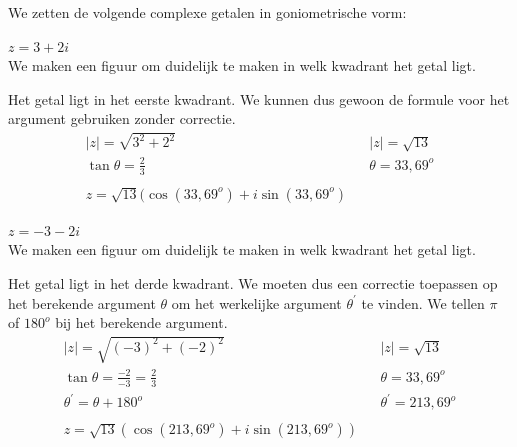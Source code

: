 	We zetten de volgende complexe getalen in goniometrische vorm: \\
\begin{voorbeeld}


	$z=3+2i$ \\  We maken een figuur om duidelijk te maken in welk kwadrant het getal ligt. \\

\begin{figure}[H]
	\centering 
	 
\end{figure}

	



	

	Het getal ligt in het eerste kwadrant. We kunnen dus gewoon de formule voor het argument gebruiken zonder correctie.\\
	\[ \begin{array}{lll}
	|z|=\sqrt{3^2 +2^2} & & |z|=\sqrt{13} \\
	\tan \theta = \frac{2}{3} & & \theta = 33,69^{o}\\
	         & &      \\
	z=\sqrt{13} (\cos (33,69^{o}) + i \sin (33,69^{o})  &  &
	\end{array} \]
\end{voorbeeld}
	
\begin{voorbeeld}
	$z=-3-2i$ \\ We maken een figuur om duidelijk te maken in welk kwadrant het getal ligt. \\
	


\begin{figure}[H]
	\centering 
	 
\end{figure}
	
	Het getal ligt in het derde kwadrant. We moeten dus een correctie toepassen op het berekende argument $\theta$ om het werkelijke argument $\theta^{'}$ te vinden. We tellen  $\pi$ of $180^{o}$ bij het berekende argument. \\
	\[ \begin{array}{lll}
	|z|=\sqrt{(-3)^2 +(-2)^2} & & |z|=\sqrt{13} \\
	\tan \theta = \frac{-2}{-3}=\frac{2}{3} & & \theta = 33,69^{o}\\
	\theta^{'}=\theta+180^{o} & & \theta^{'}=213,69^{o} \\
	&  &          \\
    z=\sqrt{13} (\cos (213,69^{o}) + i \sin (213,69^{o})) &  & 
	\end{array} \]
\end{voorbeeld}
	
